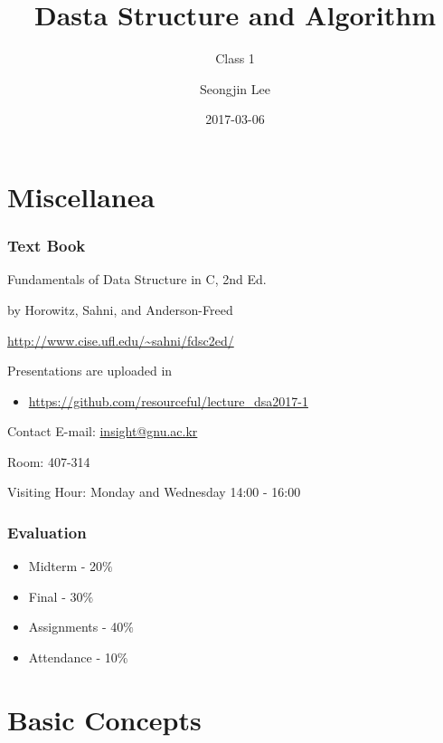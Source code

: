 \documentclass[newPxFont,sthlmFooter,nooffset]{beamer}
\title{Dasta Structure and Algorithm}
\subtitle{Class 1}
\author[SJL]{Seongjin Lee}
\institute{\href{mailto:insight@gnu.ac.kr}{insight@gnu.ac.kr}\\\url{http://resourceful.github.io}\\Systems Research Lab.\\GNU}
\date{2017-03-06}
\begin{document}
\frame[plain,t]{\titlepage} 



\section{Miscellanea} %



\begin{frame}[t]
  \frametitle{Text Book}
Fundamentals of Data Structure in C, 2nd Ed.

by Horowitz, Sahni, and Anderson-Freed


\url{http://www.cise.ufl.edu/~sahni/fdsc2ed/}

Presentations are uploaded in 
\begin{itemize}
\item \url{https://github.com/resourceful/lecture_dsa2017-1}
\end{itemize}
\end{frame}

\begin{frame}[t]{Contact}
E-mail: \url{insight@gnu.ac.kr}

Room: 407-314

Visiting Hour: Monday and Wednesday 14:00 - 16:00

\end{frame}

\begin{frame}[t]
  \frametitle{Evaluation}
  \begin{itemize}
  \item Midterm - 20$\%$
  \item Final - 30$\%$
  \item Assignments - 40$\%$ 
  \item Attendance - 10$\%$
  \end{itemize}
\end{frame}


\section{Basic Concepts}
\end{document}
